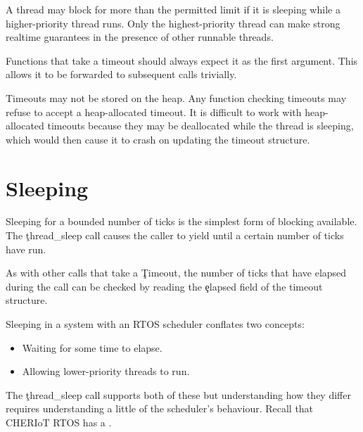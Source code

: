 \begin{note}
A thread may block for more than the permitted limit if it is sleeping while a higher-priority thread runs.
Only the highest-priority thread can make strong realtime guarantees in the presence of other runnable threads.
\end{note}

Functions that take a timeout should always expect it as the first argument.
This allows it to be forwarded to subsequent calls trivially.

\begin{warning}
Timeouts may not be stored on the heap.
Any function checking timeouts may refuse to accept a heap-allocated timeout.
It is difficult to work with heap-allocated timeouts because they may be deallocated while the thread is sleeping, which would then cause it to crash on updating the timeout structure.
\end{warning}

\section{Sleeping}

Sleeping for a bounded number of ticks is the simplest form of blocking available.
The \c{thread_sleep} call causes the caller to yield until a certain number of ticks have run.


As with other calls that take a \c{Timeout}, the number of ticks that have elapsed during the call can be checked by reading the \c{elapsed} field of the timeout structure.

Sleeping in a system with an RTOS scheduler conflates two concepts:

\begin{itemize}
	\item{Waiting for some time to elapse.}
	\item{Allowing lower-priority threads to run.}
\end{itemize}

The \c{thread_sleep} call supports both of these but understanding how they differ requires understanding a little of the scheduler's behaviour.
Recall that CHERIoT RTOS has a .

